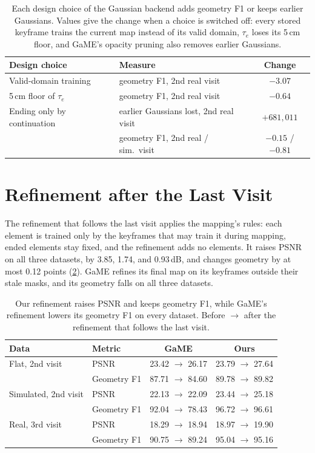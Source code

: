 \begin{table}[h]
\centering\small
\caption{Each design choice of the Gaussian backend adds geometry F1 or keeps earlier Gaussians. Values give the change
when a choice is switched off: every stored keyframe trains the current map instead of its valid domain, $\tau_e$ loses
its 5\,cm floor, and GaME's opacity pruning also removes earlier Gaussians.}
\label{tab:supp_gaussian}
\setlength{\tabcolsep}{3pt}
\begin{tabular}{@{}llc@{}}
\toprule
Design choice & Measure & Change \\
\midrule
Valid-domain training & geometry F1, 2nd real visit & $-3.07$ \\
5\,cm floor of $\tau_e$ & geometry F1, 2nd real visit & $-0.64$ \\
Ending only by continuation & earlier Gaussians lost, 2nd real visit & $+681{,}011$ \\
 & geometry F1, 2nd real / sim.\ visit & $-0.15$ / $-0.81$ \\
\bottomrule
\end{tabular}
\end{table}

\section{Refinement after the Last Visit}
\label{sec:supp_refinement}

The refinement that follows the last visit applies the mapping's rules: each element is trained only by the keyframes that
may train it during mapping, ended elements stay fixed, and the refinement adds no elements. It raises PSNR on all three
datasets, by 3.85, 1.74, and 0.93\,dB, and changes geometry by at most 0.12 points (\cref{tab:supp_refinement}). GaME
refines its final map on its keyframes outside their stale masks, and its geometry falls on all three datasets.

\begin{table}[h]
\centering\small
\caption{Our refinement raises PSNR and keeps geometry F1, while GaME's refinement lowers its geometry F1 on every
dataset. Before $\to$ after the refinement that follows the last visit.}
\label{tab:supp_refinement}
\setlength{\tabcolsep}{3pt}
\begin{tabular}{llcc}
\toprule
Data & Metric & GaME & Ours \\
\midrule
Flat, 2nd visit & PSNR & 23.42 $\to$ 26.17 & 23.79 $\to$ 27.64 \\
            & Geometry F1 & 87.71 $\to$ 84.60 & 89.78 $\to$ 89.82 \\
Simulated, 2nd visit & PSNR & 22.13 $\to$ 22.09 & 23.44 $\to$ 25.18 \\
            & Geometry F1 & 92.04 $\to$ 78.43 & 96.72 $\to$ 96.61 \\
Real, 3rd visit & PSNR & 18.29 $\to$ 18.94 & 18.97 $\to$ 19.90 \\
            & Geometry F1 & 90.75 $\to$ 89.24 & 95.04 $\to$ 95.16 \\
\bottomrule
\end{tabular}
\end{table}

